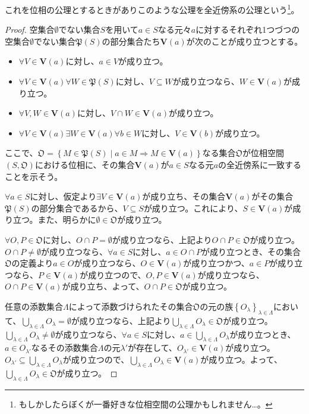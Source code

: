 \documentclass[dvipdfmx]{jsarticle}
\begin{document}
これを位相の公理とするときがありこのような公理を全近傍系の公理という\footnote{もしかしたらぼくが一番好きな位相空間の公理かもしれません…。}。
\begin{proof}
空集合$\emptyset$でない集合$S$を用いて$a \in S$なる元々$a$に対するそれぞれ1つづつの空集合$\emptyset$でない集合$\mathfrak{P}(S)$の部分集合たち$\mathbf{V}(a)$が次のことが成り立つとする。
\begin{itemize}
\item
  $\forall V \in \mathbf{V}(a)$に対し、$a \in V$が成り立つ。
\item
  $\forall V \in \mathbf{V}(a)\forall W \in \mathfrak{P}(S)$に対し、$V \subseteq W$が成り立つなら、$W \in \mathbf{V}(a)$が成り立つ。
\item
  $\forall V,W \in \mathbf{V}(a)$に対し、$V \cap W \in \mathbf{V}(a)$が成り立つ。
\item
  $\forall V \in \mathbf{V}(a)\exists W \in \mathbf{V}(a)\forall b \in W$に対し、$V \in \mathbf{V}(b)$が成り立つ。
\end{itemize}
ここで、$\mathfrak{O}=\left\{ M \in \mathfrak{P}(S) \middle| a \in M \Rightarrow M \in \mathbf{V}(a) \right\}$なる集合$\mathfrak{O}$が位相空間$\left( S,\mathfrak{O} \right)$における位相に、その集合$\mathbf{V}(a)$が$a \in S$なる元$a$の全近傍系に一致することを示そう。\par
$\forall a \in S$に対し、仮定より$\exists V \in \mathbf{V}(a)$が成り立ち、その集合$\mathbf{V}(a)$がその集合$\mathfrak{P}(S)$の部分集合であるから、$V \subseteq S$が成り立つ。これにより、$S \in \mathbf{V}(a)$が成り立つ。また、明らかに$\mathfrak{\emptyset \in O}$が成り立つ。\par
$\forall O,P \in \mathfrak{O}$に対し、$O \cap P = \emptyset$が成り立つなら、上記より$O \cap P \in \mathfrak{O}$が成り立つ。$O \cap P \neq \emptyset$が成り立つなら、$\forall a \in S$に対し、$a \in O \cap P$が成り立つとき、その集合$\mathfrak{O}$の定義より$a \in O$が成り立つなら、$O \in \mathbf{V}(a)$が成り立つかつ、$a \in P$が成り立つなら、$P \in \mathbf{V}(a)$が成り立つので、$O,P \in \mathbf{V}(a)$が成り立つなら、$O \cap P \in \mathbf{V}(a)$が成り立ち、よって、$O \cap P \in \mathfrak{O}$が成り立つ。\par
任意の添数集合$\varLambda$によって添数づけられたその集合$\mathfrak{O}$の元の族$\left\{ O_{\lambda} \right\}_{\lambda \in \varLambda}$において、$\bigcup_{\lambda \in \varLambda} O_{\lambda} = \emptyset$が成り立つなら、上記より$\bigcup_{\lambda \in \varLambda} O_{\lambda}\in \mathfrak{O}$が成り立つ。$\bigcup_{\lambda \in \varLambda} O_{\lambda} \neq \emptyset$が成り立つなら、$\forall a \in S$に対し、$a \in \bigcup_{\lambda \in \varLambda} O_{\lambda}$が成り立つとき、$a \in O_{\lambda'}$なるその添数集合$\varLambda$の元$\lambda'$が存在して、$O_{\lambda'} \in \mathbf{V}(a)$が成り立つ。$O_{\lambda'} \subseteq \bigcup_{\lambda \in \varLambda} O_{\lambda}$が成り立つので、$\bigcup_{\lambda \in \varLambda} O_{\lambda} \in \mathbf{V}(a)$が成り立つ。よって、$\bigcup_{\lambda \in \varLambda} O_{\lambda}\in \mathfrak{O}$が成り立つ。\par

\end{proof}
\end{document}
